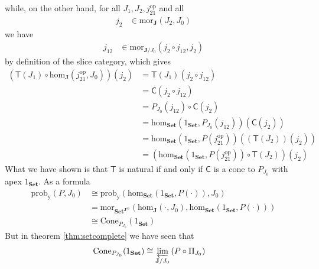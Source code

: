while, on the other hand, for all $J_{1},J_{2},j_{21}^{\textrm{op}}$ and all
\begin{align*}
  j_{2}
  &\in
  \mathrm{mor}_{\mathbf{J}}(J_{2},J_{0})
\end{align*}
we have
\begin{align*}
  j_{12}
  &\in
  \mathrm{mor}_{\mathbf{J} \slash J_{0}}
  \left(
    j_{2}
    \circ
    j_{12},
    j_{2}
  \right)
\end{align*}
by definition of the slice category, which gives
\begin{align*}
  \left(
    \mathsf{T}(J_{1})
    \circ
    \mathrm{hom}_{\mathbf{J}}
    \left(
      j_{21}^{\textrm{op}},
      J_{0}
    \right)
  \right)
  (j_{2})
  &=
  \mathsf{T}(J_{1})
  \left(
    j_{2}
    \circ
    j_{12}
  \right)
  \\
  &=
  \mathsf{C}
  \left(
    j_{2}
    \circ
    j_{12}
  \right)
  \\
  &=
  P_{J_{0}}(j_{12})
  \circ
  \mathsf{C}(j_{2})
  \\
  &=
  \mathrm{hom}_{\mathbf{Set}}
  \left(
    1_{\mathbf{Set}},
    P_{J_{0}}(j_{12})
  \right)
  (\mathsf{C}(j_{2}))
  \\
  &=
  \mathrm{hom}_{\mathbf{Set}}
  \left(
    1_{\mathbf{Set}},
    P(j_{21}^{\textrm{op}})
  \right)
  \left(
    (\mathsf{T}(J_{2}))(j_{2})
  \right)
  \\
  &=
  \left(
    \mathrm{hom}_{\mathbf{Set}}
    \left(
      1_{\mathbf{Set}},
      P(j_{21}^{\textrm{op}})
    \right)
    \circ
    \mathsf{T}(J_{2})
  \right)
  (j_{2})
\end{align*}
What we have shown is that $\mathsf{T}$ is natural if and only if $\mathsf{C}$ is a cone to $P_{J_{0}}$ with apex $1_{\mathbf{Set}}$.
As a formula
\begin{align*}
  \mathrm{prob}_{\mathrm{y}}
  \left(
    P,
    J_{0}
  \right)
  &\cong
  \mathrm{prob}_{\mathrm{y}}
  \left(
    \mathrm{hom}_{\mathbf{Set}}(1_{\mathbf{Set}},P(\cdot)),
    J_{0}
  \right)
  \\
  &=
  \mathrm{mor}_{\mathbf{Set}^{\mathbf{J}^{\textrm{op}}}}
  \left(
    \mathrm{hom}_{\mathbf{J}}(\cdot,J_{0}),
    \mathrm{hom}_{\mathbf{Set}}(1_{\mathbf{Set}},P(\cdot))
  \right)
  \\
  &\cong
  \mathrm{Cone}_{P_{J_{0}}}(1_{\mathbf{Set}})
\end{align*}
But in theorem \ref{thm:setcomplete} we have seen that
\begin{align*}
  \mathrm{Cone}_{P_{J_{0}}}(1_{\mathbf{Set}})
  &\cong
  \varprojlim_{\mathbf{J} \slash J_{0}}
  \left(
    P
    \circ
    \Pi_{J_{0}}
  \right)
\end{align*}
